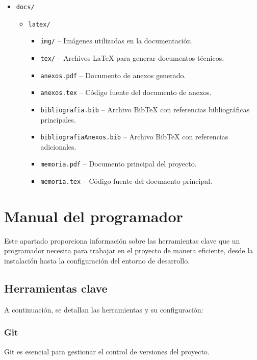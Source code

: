 \begin{itemize}
	\item \texttt{docs/}
	\begin{itemize}
		\item \texttt{latex/}
		\begin{itemize}
   			\item \texttt{img/} -- Imágenes utilizadas en la documentación.
    			\item \texttt{tex/} -- Archivos \LaTeX{} para generar documentos técnicos.
    			\item \texttt{anexos.pdf} -- Documento de anexos generado.
    			\item \texttt{anexos.tex} -- Código fuente del documento de anexos.
    			\item \texttt{bibliografia.bib} -- Archivo BibTeX con referencias bibliográficas principales.
    			\item \texttt{bibliografiaAnexos.bib} -- Archivo BibTeX con referencias adicionales.
    			\item \texttt{memoria.pdf} -- Documento principal del proyecto.
    			\item \texttt{memoria.tex} -- Código fuente del documento principal.
		\end{itemize}
	\end{itemize}
\end{itemize}


\section{Manual del programador}

Este apartado proporciona información sobre las herramientas clave que un programador necesita para trabajar en el proyecto de manera eficiente, desde la instalación hasta la configuración del entorno de desarrollo.

\subsection{Herramientas clave}

A continuación, se detallan las herramientas y su configuración:

\subsubsection{Git}
Git es esencial para gestionar el control de versiones del proyecto.

